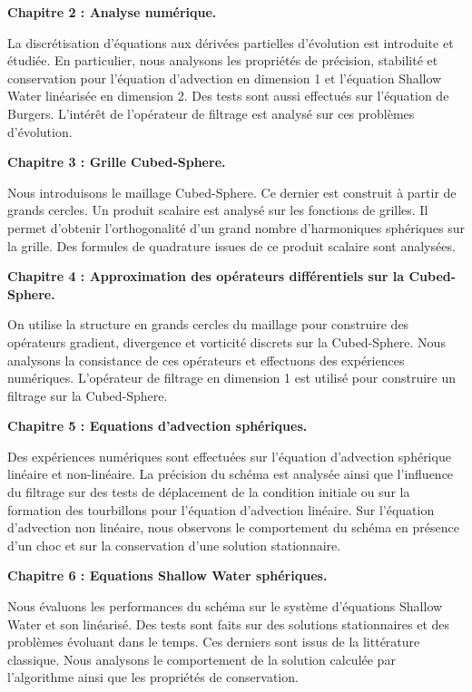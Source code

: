 \vspace{0.7cm}
\textbf{Chapitre 2 : Analyse numérique.}

La discrétisation d'équations aux dérivées partielles d'évolution est introduite et étudiée. En particulier, nous analysons les propriétés de précision, stabilité et conservation pour l'équation d'advection en dimension 1 et l'équation Shallow Water linéarisée en dimension 2. Des tests sont aussi effectués sur l'équation de Burgers. L'intérêt de l'opérateur de filtrage est analysé sur ces problèmes d'évolution.







\vspace{0.7cm}
\textbf{Chapitre 3 : Grille Cubed-Sphere.}

Nous introduisons le maillage Cubed-Sphere. Ce dernier est construit à partir de grands cercles. Un produit scalaire est analysé sur les fonctions de grilles. Il permet d'obtenir l'orthogonalité d'un grand nombre d'harmoniques sphériques sur la grille. Des formules de quadrature issues de ce produit scalaire sont analysées.






\vspace{0.7cm}
\textbf{Chapitre 4 : Approximation des opérateurs différentiels sur la Cubed-Sphere.}

On utilise la structure en grands cercles du maillage pour construire des opérateurs gradient, divergence et vorticité discrets sur la Cubed-Sphere. Nous analysons la consistance de ces opérateurs et effectuons des expériences numériques. L'opérateur de filtrage en dimension 1 est utilisé pour construire un filtrage sur la Cubed-Sphere.







\vspace{0.7cm}
\textbf{Chapitre 5 : Equations d'advection sphériques.}

Des expériences numériques sont effectuées sur l'équation d'advection sphérique linéaire et non-linéaire. La précision du schéma est analysée ainsi que l'influence du filtrage sur des tests de déplacement de la condition initiale ou sur la formation des tourbillons pour l'équation d'advection linéaire. Sur l'équation d'advection non linéaire, nous observons le comportement du schéma en présence d'un choc et sur la conservation d'une solution stationnaire.  







\vspace{0.7cm}
\textbf{Chapitre 6 : Equations Shallow Water sphériques.}

Nous évaluons les performances du schéma sur le système d'équations Shallow Water et son linéarisé. Des tests sont faits sur des solutions stationnaires et des problèmes évoluant dans le temps. Ces derniers sont issus de la littérature classique. Nous analysons le comportement de la solution calculée par l'algorithme ainsi que les propriétés de conservation.

